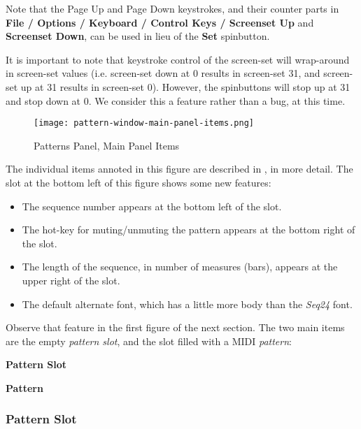    Note that the Page Up and Page Down keystrokes, and their
   counter parts in
   \textbf{File / Options / Keyboard / Control Keys / Screenset Up}
   and \textbf{Screenset Down}, can be used in lieu of the
   \textbf{Set} spinbutton.

   It is important to note that keystroke control of the screen-set will
   wrap-around in screen-set values (i.e. screen-set down at 0 results in
   screen-set 31, and screen-set up at 31 results in screen-set 0).
   However, the spinbuttons will stop up at 31 and stop down at 0.
   We consider this a feature rather than a bug, at this time.

\begin{figure}[H]
   \centering 
   \texttt{[image: pattern-window-main-panel-items.png]}
   \caption{Patterns Panel, Main Panel Items}
   \label{fig:pattern_window_main_panel_items}
\end{figure}

   The individual items annoted in this figure are described in
   , in more detail.
   The slot at the bottom left of this figure shows some new features:

   \begin{itemize}
      \item The sequence number appears at the bottom left of the slot.
      \item The hot-key for muting/unmuting the pattern appears at the bottom
         right of the slot.
      \item The length of the sequence, in number of measures (bars), appears
         at the upper right of the slot.
      \item The default alternate font, which has a little more body than the
         \textsl{Seq24} font.
   \end{itemize}

   Observe that feature in the first figure of the next section.
   The two main items are the empty \textsl{pattern slot}, and the slot filled
   with a MIDI \textsl{pattern}:

   \begin{enumber}
      \item \textbf{Pattern Slot}
      \item \textbf{Pattern}
   \end{enumber}

\subsubsection{Pattern Slot}
\label{subsubsec:seq64_patterns_pattern_slot}

